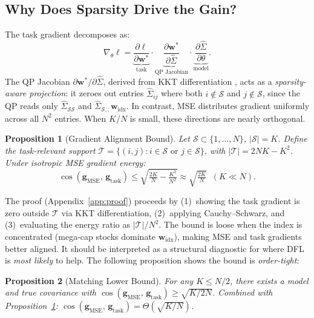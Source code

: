 \documentclass[letterpaper]{article}
\newtheorem{proposition}{Proposition}
\newcommand{\bw}{\mathbf{w}}
\newcommand{\bSigma}{\hat{\Sigma}}
\newcommand{\cS}{\mathcal{S}}
\begin{document}
\subsection{Why Does Sparsity Drive the Gain?}

The task gradient decomposes as:
\begin{equation}
  \nabla_\theta \ell = \underbrace{\frac{\partial \ell}{\partial \bw^*}}_{\text{task}} \cdot \underbrace{\frac{\partial \bw^*}{\partial \bSigma}}_{\text{QP Jacobian}} \cdot \underbrace{\frac{\partial \bSigma}{\partial \theta}}_{\text{model}}.
  \label{eq:chain}
\end{equation}
The QP Jacobian $\partial \bw^* / \partial \bSigma$, derived from KKT differentiation \citep{amos2017optnet}, acts as a \emph{sparsity-aware projection}: it zeroes out entries $\bSigma_{ij}$ where both $i \notin \cS$ and $j \notin \cS$, since the QP reads only $\bSigma_{\cS\cS}$ and $\bSigma_{\cS,:}\bw_{\text{idx}}$. In contrast, MSE distributes gradient uniformly across all $N^2$ entries. When $K/N$ is small, these directions are nearly orthogonal.

\begin{proposition}[Gradient Alignment Bound]
\label{prop:alignment}
Let $\cS \subset \{1,\ldots,N\}$, $|\cS| = K$. Define the task-relevant support $\mathcal{T} = \{(i,j) : i \in \cS \text{ or } j \in \cS\}$, with $|\mathcal{T}| = 2NK - K^2$. Under isotropic MSE gradient energy:
\begin{equation}
\cos(\mathbf{g}_{\mathrm{MSE}},\, \mathbf{g}_{\mathrm{task}}) \leq \sqrt{\tfrac{2K}{N} - \tfrac{K^2}{N^2}} \approx \sqrt{\tfrac{2K}{N}} \;\; (K \ll N).
\label{eq:alignment}
\end{equation}
\end{proposition}

The proof (Appendix~\ref{app:proof}) proceeds by (1)~showing the task gradient is zero outside $\mathcal{T}$ via KKT differentiation, (2)~applying Cauchy--Schwarz, and (3)~evaluating the energy ratio as $|\mathcal{T}|/N^2$. The bound is loose when the index is concentrated (mega-cap stocks dominate $\bw_{\text{idx}}$), making MSE and task gradients better aligned. It should be interpreted as a structural diagnostic for where DFL is \emph{most likely} to help. The following proposition shows the bound is \emph{order-tight}:

\begin{proposition}[Matching Lower Bound]
\label{prop:lower}
For any $K \leq N/2$, there exists a model and true covariance with $\cos(\mathbf{g}_{\mathrm{MSE}},\, \mathbf{g}_{\mathrm{task}}) \geq \sqrt{K/2N}$.
Combined with Proposition~\ref{prop:alignment}: $\cos(\mathbf{g}_{\mathrm{MSE}},\, \mathbf{g}_{\mathrm{task}}) = \Theta(\sqrt{K/N})$.
\end{proposition}
\end{document}
